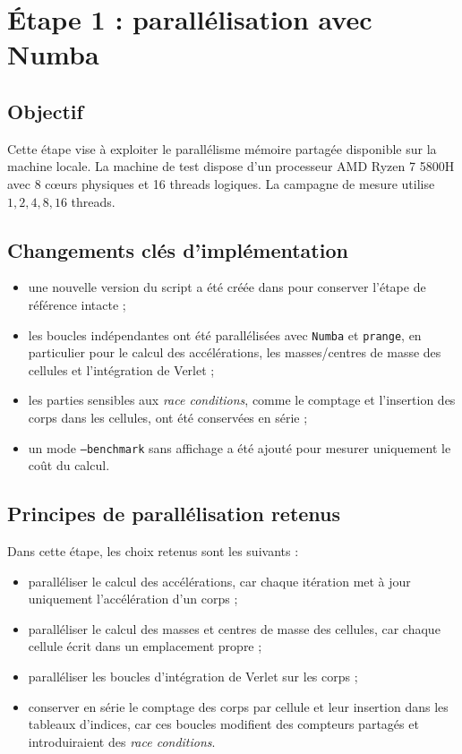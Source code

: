 \section{Étape 1 : parallélisation avec Numba}

\subsection{Objectif}

Cette étape vise à exploiter le parallélisme mémoire partagée disponible sur la machine locale. La machine de test dispose d'un processeur AMD Ryzen 7 5800H avec 8 cœurs physiques et 16 threads logiques. La campagne de mesure utilise \(1, 2, 4, 8, 16\) threads.

\subsection{Changements clés d'implémentation}

\begin{itemize}
    \item une nouvelle version du script a été créée dans  pour conserver l'étape de référence intacte ;
    \item les boucles indépendantes ont été parallélisées avec \texttt{Numba} et \texttt{prange}, en particulier pour le calcul des accélérations, les masses/centres de masse des cellules et l'intégration de Verlet ;
    \item les parties sensibles aux \textit{race conditions}, comme le comptage et l'insertion des corps dans les cellules, ont été conservées en série ;
    \item un mode \texttt{--benchmark} sans affichage a été ajouté pour mesurer uniquement le coût du calcul.
\end{itemize}

\subsection{Principes de parallélisation retenus}

Dans cette étape, les choix retenus sont les suivants :
\begin{itemize}
    \item paralléliser le calcul des accélérations, car chaque itération met à jour uniquement l'accélération d'un corps ;
    \item paralléliser le calcul des masses et centres de masse des cellules, car chaque cellule écrit dans un emplacement propre ;
    \item paralléliser les boucles d'intégration de Verlet sur les corps ;
    \item conserver en série le comptage des corps par cellule et leur insertion dans les tableaux d'indices, car ces boucles modifient des compteurs partagés et introduiraient des \textit{race conditions}.
\end{itemize}

